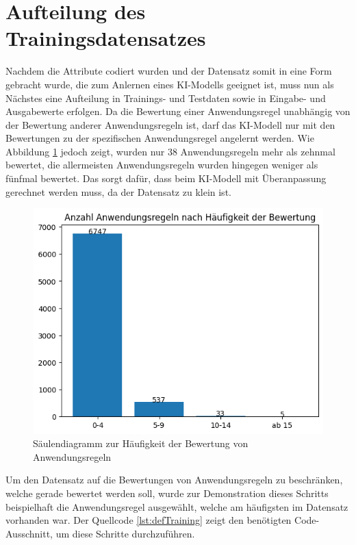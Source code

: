 \section{Aufteilung des Trainingsdatensatzes}
\label{chap:Trainingssplit}
Nachdem die Attribute codiert wurden und der Datensatz somit in eine Form gebracht wurde, die zum Anlernen eines \ac{KI}-Modells geeignet ist, 
muss nun als Nächstes eine Aufteilung in Trainings- und Testdaten sowie in Eingabe- und Ausgabewerte erfolgen. Da die Bewertung einer Anwendungsregel
unabhängig von der Bewertung anderer Anwendungsregeln ist, darf das \ac{KI}-Modell nur mit den Bewertungen zu der spezifischen Anwendungsregel angelernt werden.
Wie Abbildung \ref*{fig:ARMenge} jedoch zeigt, wurden nur 38 Anwendungsregeln mehr als zehnmal bewertet, die allermeisten Anwendungsregeln wurden hingegen weniger als 
fünfmal bewertet. Das sorgt dafür, dass beim \ac{KI}-Modell mit Überanpassung gerechnet werden muss, da der Datensatz zu klein ist.
\begin{figure}[H]
    \centering
    \includegraphics[width = \textwidth]{abbildungen/BalkenAR.png}
    \caption{Säulendiagramm zur Häufigkeit der Bewertung von Anwendungsregeln}
    \label{fig:ARMenge}
\end{figure}

Um den Datensatz auf die Bewertungen von Anwendungsregeln zu beschränken, welche gerade bewertet werden soll, wurde zur Demonstration dieses Schritts 
beispielhaft die Anwendungsregel ausgewählt, welche am häufigsten im Datensatz vorhanden war. Der Quellcode \ref*{lst:defTraining} zeigt den benötigten Code-Ausschnitt,
um diese Schritte durchzuführen.

